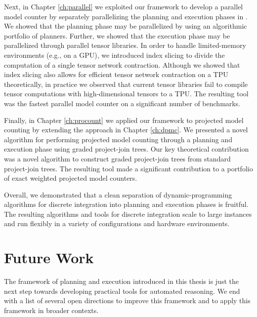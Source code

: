 Next, in Chapter \ref{ch:parallel} we exploited our framework to develop a parallel model counter by separately parallelizing the planning and execution phases in .
We showed that the planning phase may be parallelized by using an algorithmic portfolio \cite{XHHL08} of planners.
Further, we showed that the execution phase may be parallelized through parallel tensor libraries.
In order to handle limited-memory environments (e.g., on a GPU), we introduced index slicing to divide the computation of a single tensor network contraction.
Although we showed that index slicing also allows for efficient tensor network contraction on a TPU theoretically, in practice we observed that current tensor libraries fail to compile tensor computations with high-dimensional tensors to a TPU.
The resulting tool  was the fastest parallel model counter on a significant number of benchmarks.

Finally, in Chapter \ref{ch:procount} we applied our framework to projected model counting by extending the approach in Chapter \ref{ch:dpmc}.
We presented a novel algorithm for performing projected model counting through a planning and execution phase using graded project-join trees.
Our key theoretical contribution was a novel algorithm to construct graded project-join trees from standard project-join trees.
The resulting tool  made a significant contribution to a portfolio of exact weighted projected model counters.

Overall, we demonstrated that a clean separation of dynamic-programming algorithms for discrete integration into planning and execution phases is fruitful. The resulting algorithms and tools for discrete integration scale to large instances and run flexibly in a variety of configurations and hardware environments.

\section{Future Work}
The framework of planning and execution introduced in this thesis is just the next step towards developing practical tools for automated reasoning.
We end with a list of several open directions to improve this framework and to apply this framework in broader contexts.


